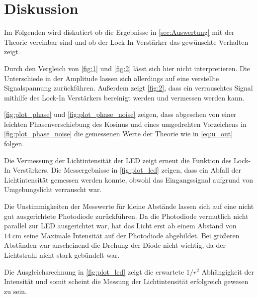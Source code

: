 \section{Diskussion}
\label{sec:Diskussion}


Im Folgenden wird diskutiert ob die Ergebnisse in \autoref{sec:Auswertung} mit der Theorie vereinbar sind und ob der Lock-In Verstärker das gewünschte Verhalten zeigt.

Durch den Vergleich von \autoref{fig:1} und \autoref{fig:2} lässt sich hier nicht interpretieren.
Die Unterschiede in der Amplitude lassen sich allerdings auf eine verstellte Signalspannung zurückführen.
Außerdem zeigt \autoref{fig:2}, dass ein verrauschtes Signal mithilfe des Lock-In Verstärkers bereinigt werden und vermessen werden kann.

\autoref{fig:plot_phase} und \autoref{fig:plot_phase_noise} zeigen, dass abgesehen von einer leichten Phasenverschiebung des Kosinus und eines umgedrehten Vorzeichens in \autoref{fig:plot_phase_noise} die gemessenen Werte der Theorie wie in \autoref{eq:u_out} folgen.

Die Vermessung der Lichtintensität der LED zeigt erneut die Funktion des Lock-In Verstärkers.
Die Messergebnisse in \autoref{fig:plot_led} zeigen, dass ein Abfall der Lichtintensität gemessen werden konnte, obwohl das Eingangssignal aufgrund von Umgebungslicht verrauscht war.

Die Unstimmigkeiten der Messwerte für kleine Abstände lassen sich auf eine nicht gut ausgerichtete Photodiode zurückführen.
Da die Photodiode vermutlich nicht parallel zur LED ausgerichtet war, hat das Licht erst ab einem Abstand von $\SI{14}{\centi\meter}$ seine Maximale Intensität auf der Photodiode abgebildet. 
Bei größeren Abständen war anscheinend die Drehung der Diode nicht wichtig, da der Lichtstrahl nicht stark gebündelt war. 

Die Ausgleichsrechnung in \autoref{fig:plot_led} zeigt die erwartete $1/r^2$ Abhängigkeit der Intensität und somit scheint die Messung der Lichtintensität erfolgreich gewesen zu sein.
